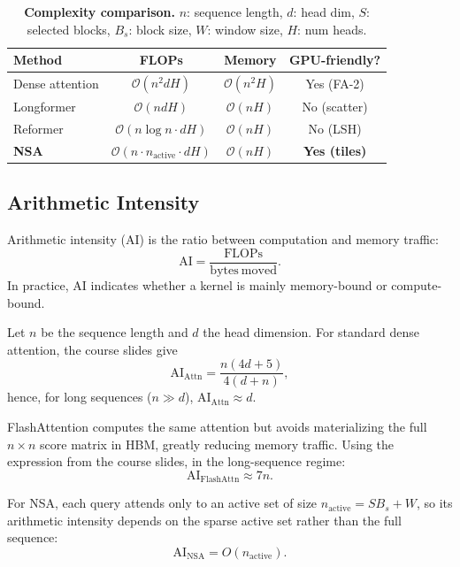 \documentclass[10pt,twocolumn]{article}
\begin{document}
\begin{table}[h]
\centering
\caption{\textbf{Complexity comparison.} $n$: sequence length, $d$: head dim,
$S$: selected blocks, $B_s$: block size, $W$: window size, $H$: num heads.}
\label{tab:complexity}
\small\setlength{\tabcolsep}{3pt}
\begin{tabular}{@{}lccc@{}}
\toprule
\textbf{Method} & \textbf{FLOPs} & \textbf{Memory} & \textbf{GPU-friendly?} \\
\midrule
Dense attention & $\mathcal{O}(n^2 d H)$ & $\mathcal{O}(n^2 H)$ & \cellcolor{nsa_green!20}Yes (FA-2) \\
Longformer & $\mathcal{O}(n d H)$ & $\mathcal{O}(n H)$ & \cellcolor{nsa_red!20}No (scatter) \\
Reformer & $\mathcal{O}(n \log n \cdot d H)$ & $\mathcal{O}(n H)$ & \cellcolor{nsa_red!20}No (LSH) \\
\textbf{NSA} & $\mathcal{O}(n \cdot n_\text{active} \cdot d H)$ & $\mathcal{O}(n H)$ & \cellcolor{nsa_green!35}\textbf{Yes (tiles)} \\
\bottomrule
\end{tabular}
\end{table}

\subsection{Arithmetic Intensity}

Arithmetic intensity (AI) is the ratio between computation and memory traffic:
\[
  \mathrm{AI} = \frac{\mathrm{FLOPs}}{\mathrm{bytes\ moved}}.
\]
In practice, AI indicates whether a kernel is mainly memory-bound or compute-bound.

Let $n$ be the sequence length and $d$ the head dimension.
For standard dense attention, the course slides give
\[
  \mathrm{AI}_{\mathrm{Attn}} = \frac{n(4d+5)}{4(d+n)},
\]
hence, for long sequences ($n \gg d$), $\mathrm{AI}_{\mathrm{Attn}} \approx d$.

FlashAttention computes the same attention but avoids materializing the full $n\times n$
score matrix in HBM, greatly reducing memory traffic.
Using the expression from the course slides, in the long-sequence regime:
\[
  \mathrm{AI}_{\mathrm{FlashAttn}} \approx 7n.
\]

For NSA, each query attends only to an active set of size $n_{\mathrm{active}} = S B_s + W$,
so its arithmetic intensity depends on the sparse active set rather than the full sequence:
\[
  \mathrm{AI}_{\mathrm{NSA}} = O(n_{\mathrm{active}}).
\]
\end{document}
